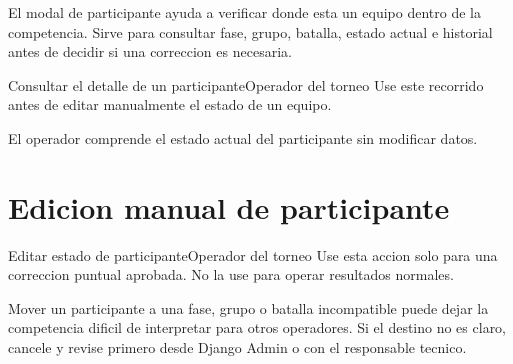 El modal de participante ayuda a verificar donde esta un equipo dentro de la competencia. Sirve para consultar fase, grupo, batalla, estado actual e historial antes de decidir si una correccion es necesaria.

\begin{procedimiento}{Consultar el detalle de un participante}{Operador del torneo}
Use este recorrido antes de editar manualmente el estado de un equipo.
\end{procedimiento}


\begin{resultadoesperado}
El operador comprende el estado actual del participante sin modificar datos.
\end{resultadoesperado}

\section{Edicion manual de participante}


\begin{procedimiento}{Editar estado de participante}{Operador del torneo}
Use esta accion solo para una correccion puntual aprobada. No la use para operar resultados normales.
\end{procedimiento}


\begin{advertencia}
Mover un participante a una fase, grupo o batalla incompatible puede dejar la competencia dificil de interpretar para otros operadores. Si el destino no es claro, cancele y revise primero desde Django Admin o con el responsable tecnico.
\end{advertencia}

